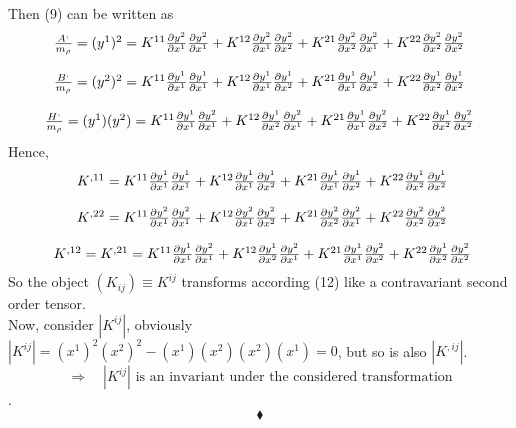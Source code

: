  Then (9) can be written as
 \begin {align}
\begin{array}{c}
\frac{A^,}{m_{\rho}} = (y^1)^2 =  K^{11}\pdv{y^2}{x^1} \pdv{y^2}{x^1}  +  K^{12}\pdv{y^2}{x^1}\pdv{y^2}{x^2} + K^{21}\pdv{y^2}{x^2}\pdv{y^2}{x^1} + K^{22}\pdv{y^2}{x^2}\pdv{y^2}{x^2}\\\\
\frac{B^,}{m_{\rho}} = (y^2)^2 =  K^{11}\pdv{y^1}{x^1} \pdv{y^1}{x^1}  +  K^{12}\pdv{y^1}{x^1}\pdv{y^1}{x^2} + K^{21}\pdv{y^1}{x^1}\pdv{y^1}{x^2} + K^{22}\pdv{y^1}{x^2}\pdv{y^1}{x^2}\\\\
\frac{H^,}{m_{\rho}} = (y^1)(y^2)  = K^{11}\pdv{y^1}{x^1} \pdv{y^2}{x^1}  +  K^{12}\pdv{y^1}{x^2}\pdv{y^2}{x^1} + K^{21}\pdv{y^1}{x^1}\pdv{y^2}{x^2} + K^{22}\pdv{y^1}{x^2}\pdv{y^2}{x^2}
  \end{array}
  \end{align}
  Hence,
  \begin{align}
\begin{array}{c}
  \ K^{,11}  =  K^{11}\pdv{y^1}{x^1} \pdv{y^1}{x^1}  +  K^{12}\pdv{y^1}{x^1}\pdv{y^1}{x^2} + K^{21}\pdv{y^1}{x^1}\pdv{y^1}{x^2} + K^{22}\pdv{y^1}{x^2}\pdv{y^1}{x^2}\\\\
\ K^{,22} =  K^{11}\pdv{y^2}{x^1} \pdv{y^2}{x^1}  +  K^{12}\pdv{y^2}{x^1}\pdv{y^2}{x^2} + K^{21}\pdv{y^2}{x^2}\pdv{y^2}{x^1} + K^{22}\pdv{y^2}{x^2}\pdv{y^2}{x^2}\\\\
 \ K^{,12} = K^{,21} = K^{11}\pdv{y^1}{x^1} \pdv{y^2}{x^1}  +  K^{12}\pdv{y^1}{x^2}\pdv{y^2}{x^1} + K^{21}\pdv{y^1}{x^1}\pdv{y^2}{x^2} + K^{22}\pdv{y^1}{x^2}\pdv{y^2}{x^2}
  \end{array}
\end{align}
So the object $(K_{ij})\equiv K^{ij}$ transforms according (12) like a contravariant second order tensor.\\

Now, consider $|K^{ij}|$, obviously $|K^{ij}| = (x^1)^2(x^2)^2-(x^1)(x^2)(x^2)(x^1) =0$, but so is also $|K^{,ij}|$.
$$\Rightarrow\quad |K^{ij}| \text{ is an invariant under the considered transformation}$$. 
$$\blacklozenge$$
\pagebreak[4]

